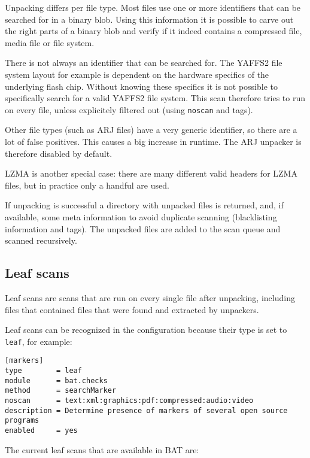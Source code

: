 \documentclass[10pt,a4paper]{article}
\begin{document}
Unpacking differs per file type. Most files use one or more identifiers that
can be searched for in a binary blob. Using this information it is possible
to carve out the right parts of a binary blob and verify if it indeed contains
a compressed file, media file or file system.

There is not always an identifier that can be searched for. The YAFFS2 file
system layout for example is dependent on the hardware specifics of the
underlying flash chip. Without knowing these specifics it is not possible to
specifically search for a valid YAFFS2 file system. This scan therefore tries
to run on every file, unless explicitely filtered out (using \texttt{noscan}
and tags).

Other file types (such as ARJ files) have a very generic identifier, so there
are a lot of false positives. This causes a big increase in runtime. The ARJ
unpacker is therefore disabled by default.

LZMA is another special case: there are many different valid headers for LZMA
files, but in practice only a handful are used.

If unpacking is successful a directory with unpacked files is returned, and, if
available, some meta information to avoid duplicate scanning (blacklisting
information and tags). The unpacked files are added to the scan queue and
scanned recursively.

\subsection{Leaf scans}

Leaf scans are scans that are run on every single file after unpacking,
including files that contained files that were found and extracted by unpackers.

Leaf scans can be recognized in the configuration because their type is set to
\texttt{leaf}, for example:

\begin{verbatim}
[markers]
type        = leaf
module      = bat.checks
method      = searchMarker
noscan      = text:xml:graphics:pdf:compressed:audio:video
description = Determine presence of markers of several open source programs
enabled     = yes
\end{verbatim}

The current leaf scans that are available in BAT are:
\end{document}
